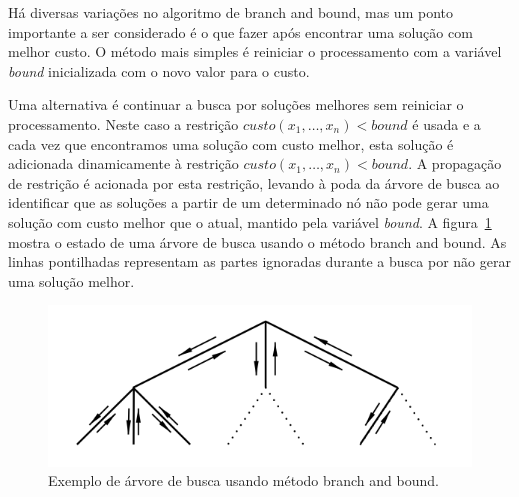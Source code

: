 \begin{itemize}
{        Há diversas variações no algoritmo de branch and bound, mas um
        ponto importante a ser considerado é o que fazer após encontrar
        uma solução com melhor custo. O método mais simples é reiniciar
        o processamento com a variável \textit{bound} inicializada com o
        novo valor para o custo.

        Uma alternativa é continuar a busca por soluções melhores sem
        reiniciar o processamento. Neste caso a restrição $custo(x_1,
        \ldots, x_n) < \textit{bound}$ é usada e a cada vez que
        encontramos uma solução com custo melhor, esta solução é
        adicionada dinamicamente à restrição $custo(x_1, \ldots, x_n) <
        \textit{bound}$. A propagação de restrição é acionada por esta
        restrição, levando à poda da árvore de busca ao identificar que
        as soluções a partir de um determinado nó não pode gerar uma
        solução com custo melhor que o atual, mantido pela variável
        \textit{bound}.  A figura~\ref{fig:bbsearchtree} mostra o estado
        de uma árvore de busca usando o método branch and bound. As
        linhas pontilhadas representam as partes ignoradas durante a
        busca por não gerar uma solução melhor.

        \begin{figure}[h]
            \centering 
            \includegraphics{images/bbsearchtree.png}
            \caption{Exemplo de árvore de busca usando método branch and
            bound.} 
            \label{fig:bbsearchtree}
        \end{figure}}

\end{itemize}

